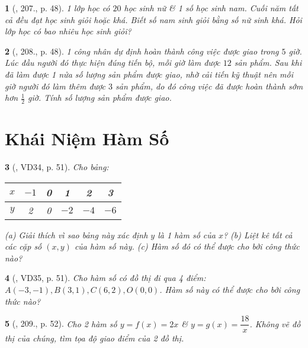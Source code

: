 \documentclass{article}
\newtheorem{baitoan}{}
\begin{document}
\begin{baitoan}[\cite{Tuyen_Toan_8}, 207., p. 48]
	1 lớp học có $20$ học sinh nữ \& 1 số học sinh nam. Cuối năm tất cả đều đạt học sinh giỏi hoặc khá. Biết số nam sinh giỏi bằng số nữ sinh khá. Hỏi lớp học có bao nhiêu học sinh giỏi?
\end{baitoan}

\begin{baitoan}[\cite{Tuyen_Toan_8}, 208., p. 48]
	1 công nhân dự định hoàn thành công việc được giao trong $5$ giờ. Lúc đầu người đó thực hiện đúng tiến bộ, mỗi giờ làm được $12$ sản phẩm. Sau khi đã làm được 1 nửa số lượng sản phẩm được giao, nhờ cải tiến kỹ thuật nên mỗi giờ người đó làm thêm được $3$ sản phẩm, do đó công việc đã được hoàn thành sớm hơn $\frac{1}{2}$ giờ. Tính số lượng sản phẩm được giao.
\end{baitoan}


\section{Khái Niệm Hàm Số}

\begin{baitoan}[\cite{Tuyen_Toan_8}, VD34, p. 51]
	Cho bảng:
	\begin{table}[H]
		\centering
		\begin{tabular}{|c|c|c|c|c|c|}
			\hline
			$x$ & $-1$ & 0 & 1 & 2 & 3 \\
			\hline
			$y$ & 2 & 0 & $-2$ & $-4$ & $-6$ \\
			\hline
		\end{tabular}
	\end{table}
	\noindent(a) Giải thích vì sao bảng này xác định $y$ là 1 hàm số của $x$? (b) Liệt kê tất cả các cặp số $(x,y)$ của hàm số này. (c) Hàm số đó có thể được cho bởi công thức nào?
\end{baitoan}

\begin{baitoan}[\cite{Tuyen_Toan_8}, VD35, p. 51]
	Cho hàm số có đồ thị đi qua 4 điểm: $A(-3,-1),B(3,1),C(6,2),O(0,0)$. Hàm số này có thể được cho bởi công thức nào?
\end{baitoan}

\begin{baitoan}[\cite{Tuyen_Toan_8}, 209., p. 52]
	Cho 2 hàm số $y = f(x) = 2x$ \& $y = g(x) = \dfrac{18}{x}$. Không vẽ đồ thị của chúng, tìm tọa độ giao điểm của 2 đồ thị.
\end{baitoan}
\end{document}
